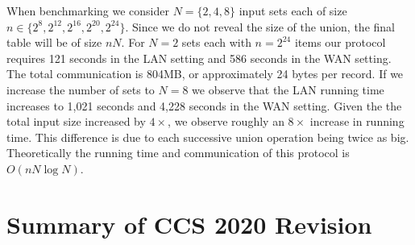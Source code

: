 \documentclass[11pt,letterpaper]{article}
\begin{document}
When benchmarking we consider $N=\{2,4,8\}$ input sets each of size $n\in \{2^8, 2^{12}, 2^{16}, 2^{20}, 2^{24}\}$. Since we do not reveal the size of the union, the final table will be of size $nN$. For $N=2$ sets each with $n=2^{24}$ items our protocol requires 121 seconds in the LAN setting and 586 seconds in the WAN setting. The total communication is 804MB, or approximately 24 bytes per record. If we increase the number of sets to $N=8$ we observe that the LAN running time increases to 1,021 seconds and 4,228 seconds  in the WAN setting. Given the the total input size increased by $4\times$, we observe roughly an $8\times$ increase in running time. This difference is due to each successive union operation being twice as big. Theoretically the running time and communication of this protocol is $O(nN\log N)$.

  




\appendix
\iffullversion
\else
\iffullversion
\else


\section{Summary of CCS 2020 Revision}
\end{document}
